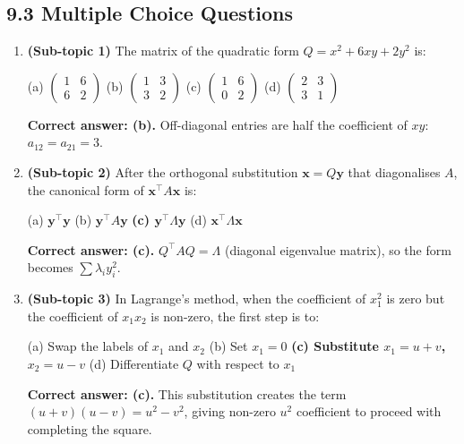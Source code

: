 \documentclass[12pt,a4paper]{article}
\begin{document}
\subsection*{9.3 Multiple Choice Questions}

\begin{enumerate}[leftmargin=2em, label=\textbf{MCQ\arabic*.}]
  \item \textbf{(Sub-topic 1)} The matrix of the quadratic form $Q = x^{2} + 6xy + 2y^{2}$ is:

  (a) $\begin{pmatrix}1&6\\6&2\end{pmatrix}$
  \quad (b) $\begin{pmatrix}1&3\\3&2\end{pmatrix}$
  \quad (c) $\begin{pmatrix}1&6\\0&2\end{pmatrix}$
  \quad (d) $\begin{pmatrix}2&3\\3&1\end{pmatrix}$

  \textbf{Correct answer: (b).} Off-diagonal entries are half the coefficient of $xy$: $a_{12} = a_{21} = 3$.

  \item \textbf{(Sub-topic 2)} After the orthogonal substitution $\mathbf{x} = Q\mathbf{y}$ that diagonalises $A$, the canonical form of $\mathbf{x}^{\top}A\mathbf{x}$ is:

  (a) $\mathbf{y}^{\top}\mathbf{y}$
  \quad (b) $\mathbf{y}^{\top}A\mathbf{y}$
  \quad \textbf{(c) $\mathbf{y}^{\top}\Lambda\mathbf{y}$}
  \quad (d) $\mathbf{x}^{\top}\Lambda\mathbf{x}$

  \textbf{Correct answer: (c).} $Q^{\top}AQ = \Lambda$ (diagonal eigenvalue matrix), so the form becomes $\sum \lambda_i y_i^{2}$.

  \item \textbf{(Sub-topic 3)} In Lagrange's method, when the coefficient of $x_1^{2}$ is zero but the coefficient of $x_1 x_2$ is non-zero, the first step is to:

  (a) Swap the labels of $x_1$ and $x_2$
  \quad (b) Set $x_1 = 0$
  \quad \textbf{(c) Substitute $x_1 = u+v$, $x_2 = u-v$}
  \quad (d) Differentiate $Q$ with respect to $x_1$

  \textbf{Correct answer: (c).} This substitution creates the term $(u+v)(u-v) = u^{2}-v^{2}$, giving non-zero $u^{2}$ coefficient to proceed with completing the square.


\end{enumerate}
\end{document}
